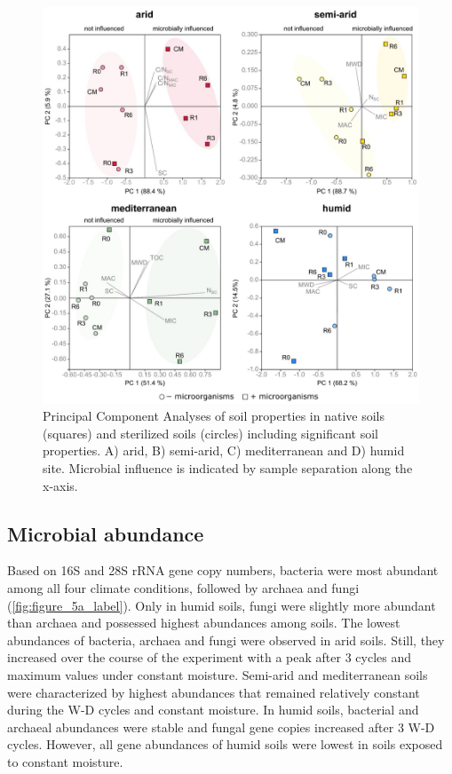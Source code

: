 \begin{figure}[H]
	\centering
	\includegraphics[width=1\textwidth]{img/M4-Figure_4.jpg}
	\caption{Principal Component Analyses of soil properties in native soils (squares) and sterilized soils (circles) including significant soil properties. A) arid, B) semi-arid, C) mediterranean and D) humid site. Microbial influence is indicated by sample separation along the x-axis.}
	\label{fig:M4-F4}
\end{figure}

\subsection{Microbial abundance}

Based on 16S and 28S rRNA gene copy numbers, bacteria were most abundant among all four climate conditions, followed by archaea and fungi (\cref{fig:figure_5a_label}). 
Only in humid soils, fungi were slightly more abundant than archaea and possessed highest abundances among soils. 
The lowest abundances of bacteria, archaea and fungi were observed in arid soils. 
Still, they increased over the course of the experiment with a peak after 3 cycles and maximum values under constant moisture. 
Semi-arid and mediterranean soils were characterized by highest abundances that remained relatively constant during the W-D cycles and constant moisture. 
In humid soils, bacterial and archaeal abundances were stable and fungal gene copies increased after 3 W-D cycles. 
However, all gene abundances of humid soils were lowest in soils exposed to constant moisture.

